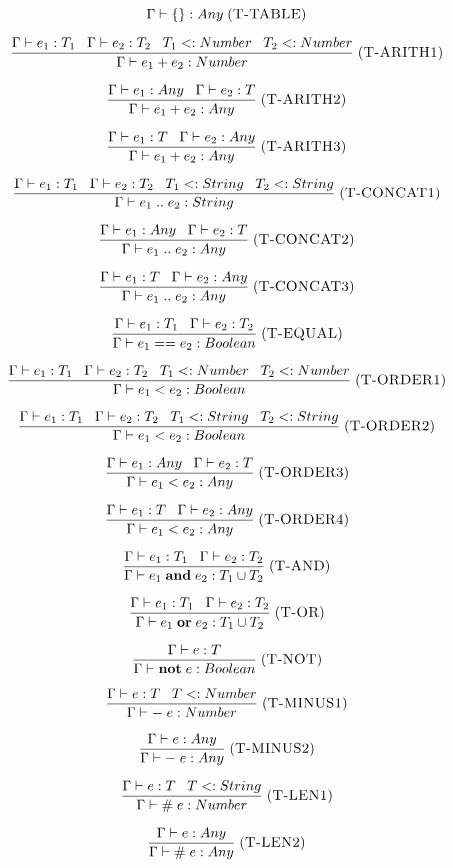 \documentclass[12pt]{article}
\newcommand{\mylabel}[1]{\; (\textsc{#1})}
\newcommand{\subtype}{<:}
\newcommand{\kw}[1]{\mathbf{#1} \;}
\newcommand{\env}{\Gamma}
\begin{document}
\[
\env \vdash \{\} : Any
\mylabel{T-TABLE}
\]

\[
\frac{\env \vdash e_{1}:T_{1} \;\;\;
      \env \vdash e_{2}:T_{2} \;\;\;
      T_{1} \subtype Number \;\;\;
      T_{2} \subtype Number}
     {\env \vdash e_{1} + e_{2} : Number}
\mylabel{T-ARITH1}
\]

\[
\frac{\env \vdash e_{1}:Any \;\;\;
      \env \vdash e_{2}:T}
     {\env \vdash e_{1} + e_{2} : Any}
\mylabel{T-ARITH2}
\]

\[
\frac{\env \vdash e_{1}:T \;\;\;
      \env \vdash e_{2}:Any}
     {\env \vdash e_{1} + e_{2} : Any}
\mylabel{T-ARITH3}
\]

\[
\frac{\env \vdash e_{1}:T_{1} \;\;\;
      \env \vdash e_{2}:T_{2} \;\;\;
      T_{1} \subtype String \;\;\;
      T_{2} \subtype String}
     {\env \vdash e_{1} \; {..} \;  e_{2} : String}
\mylabel{T-CONCAT1}
\]

\[
\frac{\env \vdash e_{1}:Any \;\;\;
      \env \vdash e_{2}:T}
     {\env \vdash e_{1} \; {..} \; e_{2} : Any}
\mylabel{T-CONCAT2}
\]

\[
\frac{\env \vdash e_{1}:T \;\;\;
      \env \vdash e_{2}:Any}
     {\env \vdash e_{1} \; {..} \; e_{2} : Any}
\mylabel{T-CONCAT3}
\]

\[
\frac{\env \vdash e_{1}:T_{1} \;\;\;
      \env \vdash e_{2}:T_{2}}
     {\env \vdash e_{1} == e_{2} : Boolean}
\mylabel{T-EQUAL}
\]

\[
\frac{\env \vdash e_{1}:T_{1} \;\;\;
      \env \vdash e_{2}:T_{2} \;\;\;
      T_{1} \subtype Number \;\;\;
      T_{2} \subtype Number}
     {\env \vdash e_{1} < e_{2} : Boolean}
\mylabel{T-ORDER1}
\]

\[
\frac{\env \vdash e_{1}:T_{1} \;\;\;
      \env \vdash e_{2}:T_{2} \;\;\;
      T_{1} \subtype String \;\;\;
      T_{2} \subtype String}
     {\env \vdash e_{1} < e_{2} : Boolean}
\mylabel{T-ORDER2}
\]

\[
\frac{\env \vdash e_{1}:Any \;\;\;
      \env \vdash e_{2}:T}
     {\env \vdash e_{1} < e_{2} : Any}
\mylabel{T-ORDER3}
\]

\[
\frac{\env \vdash e_{1}:T \;\;\;
      \env \vdash e_{2}:Any}
     {\env \vdash e_{1} < e_{2} : Any}
\mylabel{T-ORDER4}
\]

\[
\frac{\env \vdash e_{1}:T_{1} \;\;\;
      \env \vdash e_{2}:T_{2}}
     {\env \vdash e_{1} \; \kw{and} e_{2} : T_{1} \cup T_{2}}
\mylabel{T-AND}
\]

\[
\frac{\env \vdash e_{1}:T_{1} \;\;\;
      \env \vdash e_{2}:T_{2}}
     {\env \vdash e_{1} \; \kw{or} e_{2} : T_{1} \cup T_{2}}
\mylabel{T-OR}
\]

\[
\frac{\env \vdash e:T}
     {\env \vdash \kw{not} e : Boolean}
\mylabel{T-NOT}
\]

\[
\frac{\env \vdash e:T \;\;\;
      T \subtype Number}
     {\env \vdash - \; e : Number}
\mylabel{T-MINUS1}
\]

\[
\frac{\env \vdash e:Any}
     {\env \vdash - \; e : Any}
\mylabel{T-MINUS2}
\]

\[
\frac{\env \vdash e:T \;\;\;
      T \subtype String}
     {\env \vdash \# \; e : Number}
\mylabel{T-LEN1}
\]

\[
\frac{\env \vdash e:Any}
     {\env \vdash \# \; e : Any}
\mylabel{T-LEN2}
\]
\end{document}
